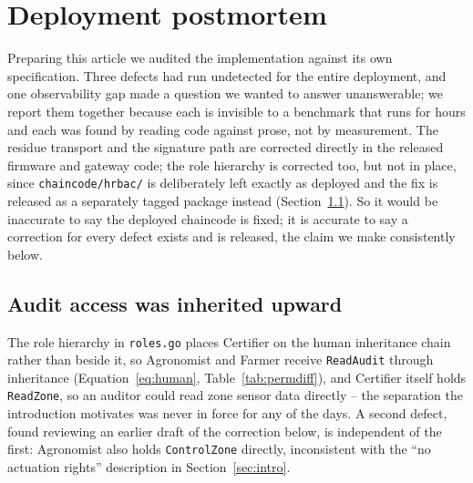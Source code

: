 \documentclass[a4paper,fleqn]{cas-sc}
\begin{document}
\FloatBarrier
\section{Deployment postmortem}
\label{sec:postmortem}

Preparing this article we audited the implementation against its own
specification. Three defects had run undetected for the entire deployment,
and one observability gap made a question we wanted to answer
unanswerable; we report them together because each is invisible to a
benchmark that runs for hours and each was found by reading code against
prose, not by measurement. The residue transport and the signature path
are corrected directly in the released firmware and gateway code; the role
hierarchy is corrected too, but not in place, since
\texttt{chaincode/hrbac/} is deliberately left exactly as deployed and the
fix is released as a separately tagged package instead
(Section~\ref{subsec:pm_policy}). So it would be inaccurate to say the
deployed chaincode is fixed; it is accurate to say a correction for every
defect exists and is released, the claim we make consistently below.

\subsection{Audit access was inherited upward}
\label{subsec:pm_policy}

The role hierarchy in \texttt{roles.go} places Certifier on the human
inheritance chain rather than beside it, so Agronomist and Farmer receive
\texttt{ReadAudit} through inheritance (Equation~\eqref{eq:human},
Table~\ref{tab:permdiff}), and Certifier itself holds \texttt{ReadZone}, so
an auditor could read zone sensor data directly -- the separation the
introduction motivates was never in force for any of the \DeployDays{}
days. A second defect, found reviewing an earlier draft of the correction
below, is independent of the first: Agronomist also holds
\texttt{ControlZone} directly, inconsistent with the ``no actuation
rights'' description in Section~\ref{sec:intro}.
\end{document}
